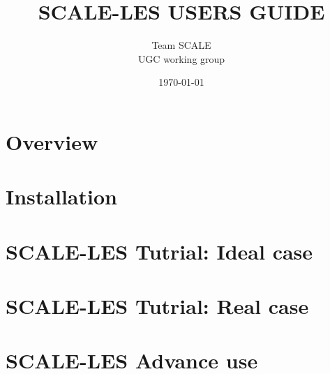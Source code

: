 \documentclass[a4paper]{jreport}
\title{{\Huge SCALE-LES USERS GUIDE \\
   \vspace{1cm}{\Large  SCALE Version 0.2.0 (SCALE-LES Version: 4.2.0) 版} }}
\author{\Large Team SCALE\\ UGC working group}
\date{\today}
\begin{document}
\maketitle
\tableofcontents

\chapter{Overview}



\chapter{Installation}


\chapter{SCALE-LES Tutrial: Ideal case}


\chapter{SCALE-LES Tutrial: Real case}







\chapter{SCALE-LES Advance use}









\appendix




\end{document}
